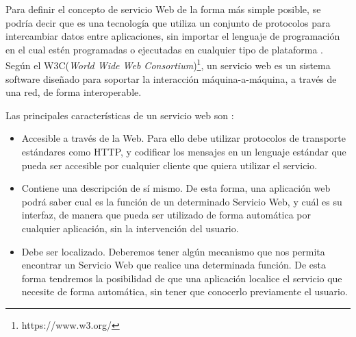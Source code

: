 Para definir el concepto de servicio Web de la forma más simple posible, se podría decir que es una tecnología que utiliza un conjunto de protocolos para intercambiar datos entre aplicaciones, sin importar el lenguaje de programación en el cual estén programadas o ejecutadas en cualquier tipo de plataforma \citep{wiki:w3c2004}. Según el W3C(\textit{World Wide Web Consortium})\footnote{https://www.w3.org/}, un servicio web es un sistema software diseñado para soportar la interacción máquina-a-máquina, a través de una red, de forma interoperable. 
\newline



Las principales características de un servicio web son \citep{TorresJoaquin2017SC}:



\begin{itemize}
	\item Accesible a través de la Web. Para ello debe utilizar protocolos de transporte estándares como HTTP, y codificar los mensajes en un lenguaje estándar que pueda ser accesible por cualquier cliente que quiera utilizar el servicio. 
	\item Contiene una descripción de sí mismo. De esta forma, una aplicación web podrá saber cual es la función de un determinado Servicio Web, y cuál es su interfaz, de manera que pueda ser utilizado de forma automática por cualquier aplicación, sin la intervención del usuario.
	\item Debe ser localizado. Deberemos tener algún mecanismo que nos permita encontrar un Servicio Web que realice una determinada función. De esta forma tendremos la posibilidad de que una aplicación localice el servicio que necesite de forma automática, sin tener que conocerlo previamente el usuario.
\end{itemize}

